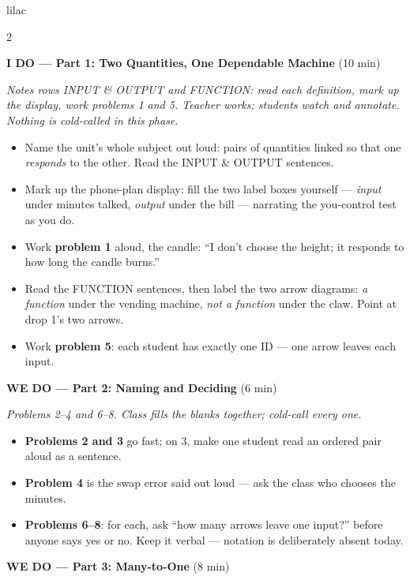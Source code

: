 \documentclass[10pt]{article}
\begin{document}
\begin{skillbox}{lilac}
\begin{multicols}{2}

\textbf{I DO --- Part 1: Two Quantities, One Dependable Machine} (10 min)

\textit{Notes rows INPUT \& OUTPUT and FUNCTION: read each definition, mark up the
display, work problems 1 and 5. Teacher works; students watch and annotate.
Nothing is cold-called in this phase.}
\begin{itemize}
  \item Name the unit's whole subject out loud: pairs of quantities linked so that
        one \textit{responds} to the other. Read the INPUT \& OUTPUT sentences.
  \item Mark up the phone-plan display: fill the two label boxes yourself ---
        \textit{input} under minutes talked, \textit{output} under the bill ---
        narrating the you-control test as you do.
  \item Work \textbf{problem 1} aloud, the candle: ``I don't choose the height;
        it responds to how long the candle burns.''
  \item Read the FUNCTION sentences, then label the two arrow diagrams:
        \textit{a function} under the vending machine, \textit{not a function}
        under the claw. Point at drop 1's two arrows.
  \item Work \textbf{problem 5}: each student has exactly one ID --- one arrow
        leaves each input.
\end{itemize}

\textbf{WE DO --- Part 2: Naming and Deciding} (6 min)

\textit{Problems 2--4 and 6--8. Class fills the blanks together; cold-call every
one.}
\begin{itemize}
  \item \textbf{Problems 2 and 3} go fast; on 3, make one student read an ordered
        pair aloud as a sentence.
  \item \textbf{Problem 4} is the swap error said out loud --- ask the class who
        chooses the minutes.
  \item \textbf{Problems 6--8}: for each, ask ``how many arrows leave one
        input?'' before anyone says yes or no. Keep it verbal --- notation is
        deliberately absent today.
\end{itemize}

\textbf{WE DO --- Part 3: Many-to-One} (8 min)


\end{multicols}
\end{skillbox}
\end{document}
